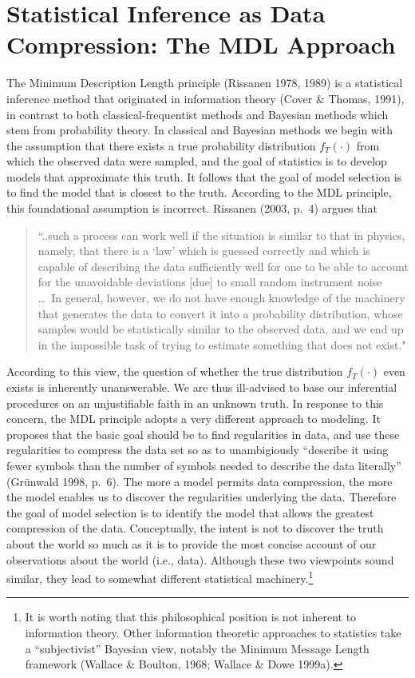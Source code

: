 \documentclass{elsart}
\begin{document}
\section{Statistical Inference as Data Compression: The MDL Approach}

The Minimum Description Length principle (Rissanen 1978, 1989) is a statistical inference method
that originated in information theory (Cover \& Thomas, 1991), in contrast to both
classical-frequentist methods and Bayesian methods which stem from probability theory. In
classical and Bayesian methods we begin with the assumption that there exists a true probability
distribution $f_T(\cdot)$ from which the observed data were sampled, and the goal of statistics is
to develop models that approximate this truth. It follows that the goal of model selection is to
find the model that is closest to the truth. According to the MDL principle, this foundational
assumption is incorrect. Rissanen (2003, p.\ 4) argues that


\begin{quote}
``..such a process can work well if the situation is similar to that in physics, namely, that
there is a `law' which is guessed correctly and which is capable of describing the data
sufficiently well for one to be able to account for the unavoidable deviations [due] to small
random instrument noise \ldots \ In general, however, we do not have enough knowledge of the
machinery that generates the data to convert it into a probability distribution, whose samples
would be statistically similar to the observed data, and we end up in the impossible task of
trying to estimate something that does not exist."
\end{quote}


\noindent According to this view, the question of whether the true distribution $f_T(\cdot)$ even
exists is inherently unanswerable. We are thus ill-advised to base our inferential procedures on
an unjustifiable faith in an unknown truth. In response to this concern, the MDL principle adopts
a very different approach to modeling. It proposes that the basic goal should be to find
regularities in data, and use these regularities to compress the data set so as to unambigiously
``describe it using fewer symbols than the number of symbols needed to describe the data
literally'' (Gr\"{u}nwald 1998, p.\ 6). The more a model permits data compression, the more the
model enables us to discover the regularities underlying the data. Therefore the goal of model
selection is to identify the model that allows the greatest compression of the data. Conceptually,
the intent is not to discover the truth about the world so much as it is to provide the most
concise account of our observations about the world (i.e., data). Although these two viewpoints
sound similar, they lead to somewhat different statistical machinery.\footnote{It is worth noting
that this philosophical position is not inherent to information theory. Other information
theoretic approaches to statistics take a ``subjectivist'' Bayesian view, notably the Minimum
Message Length framework (Wallace \& Boulton, 1968; Wallace \& Dowe 1999a).}
\end{document}
